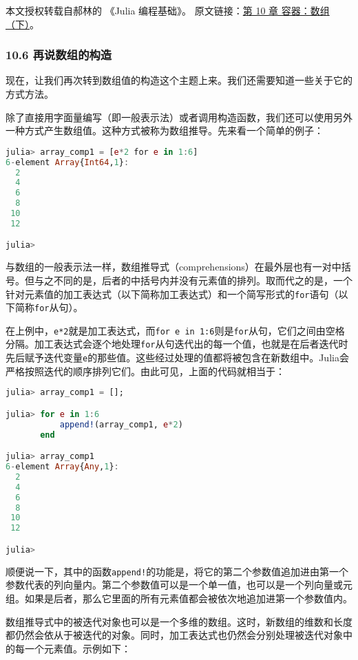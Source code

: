 
本文授权转载自郝林的 《Julia 编程基础》。 原文链接：\href{https://github.com/hyper0x/JuliaBasics/blob/master/book/ch10.md}{第 10 章 容器：数组（下）}。

\subsubsection{10.6 再说数组的构造}

现在，让我们再次转到数组值的构造这个主题上来。我们还需要知道一些关于它的方式方法。

除了直接用字面量编写（即一般表示法）或者调用构造函数，我们还可以使用另外一种方式产生数组值。这种方式被称为数组推导。先来看一个简单的例子：

\begin{lstlisting}[language=julia]
julia> array_comp1 = [e*2 for e in 1:6]
6-element Array{Int64,1}:
  2
  4
  6
  8
 10
 12

julia> 
\end{lstlisting}

与数组的一般表示法一样，数组推导式（comprehensions）在最外层也有一对中括号。但与之不同的是，后者的中括号内并没有元素值的排列。取而代之的是，一个针对元素值的加工表达式（以下简称加工表达式）和一个简写形式的\verb|for|语句（以下简称\verb|for|从句）。

在上例中，\verb|e*2|就是加工表达式，而\verb|for e in 1:6|则是\verb|for|从句，它们之间由空格分隔。加工表达式会逐个地处理\verb|for|从句迭代出的每一个值，也就是在后者迭代时先后赋予迭代变量\verb|e|的那些值。这些经过处理的值都将被包含在新数组中。Julia会严格按照迭代的顺序排列它们。由此可见，上面的代码就相当于：

\begin{lstlisting}[language=julia]
julia> array_comp1 = [];

julia> for e in 1:6
           append!(array_comp1, e*2)
       end

julia> array_comp1
6-element Array{Any,1}:
  2
  4
  6
  8
 10
 12

julia>  
\end{lstlisting}

顺便说一下，其中的函数\verb|append!|的功能是，将它的第二个参数值追加进由第一个参数代表的列向量内。第二个参数值可以是一个单一值，也可以是一个列向量或元组。如果是后者，那么它里面的所有元素值都会被依次地追加进第一个参数值内。

数组推导式中的被迭代对象也可以是一个多维的数组。这时，新数组的维数和长度都仍然会依从于被迭代的对象。同时，加工表达式也仍然会分别处理被迭代对象中的每一个元素值。示例如下：

